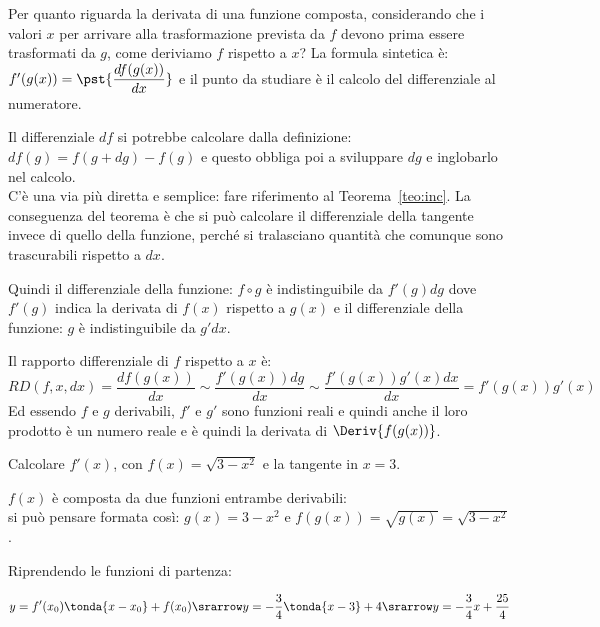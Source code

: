 \vspace{1em}
Per quanto riguarda la derivata di una funzione composta, 
considerando che i valori \(x\) per arrivare alla trasformazione prevista 
da \(f\) devono prima essere trasformati da \(g\), come deriviamo  \(f\) 
rispetto a \(x\)? La formula sintetica è: 
\(f'(g(x))=\pst{\dfrac{df(g(x))}{dx}}\) e il punto da studiare è il calcolo 
del differenziale al numeratore.

Il differenziale \(df\) si potrebbe calcolare dalla definizione: 
\(df(g)=f(g+dg)-f(g)\) e questo obbliga poi a sviluppare \(dg\) e 
inglobarlo nel calcolo. \\
C'è una via più diretta e semplice: fare riferimento al 
Teorema~\ref{teo:inc}.
La conseguenza del teorema è che si può calcolare il differenziale della 
tangente invece di quello della funzione, perché si tralasciano quantità 
che comunque sono trascurabili rispetto a \(dx\). 

Quindi il differenziale della funzione: \(f \circ g\) 
è indistinguibile da \(f'(g)dg\) 
dove \(f'(g)\) indica la derivata di \(f(x)\) rispetto a \(g(x)\) 
e il differenziale della funzione: \(g\) 
è indistinguibile da \(g'dx\). 

Il rapporto differenziale di \(f\) rispetto a \(x\) è: 
\[RD(f, x, dx) = \dfrac{df(g(x))}{dx} \sim 
          \dfrac{f'(g(x)) dg}{dx} \sim 
          \dfrac{f'(g(x)) g'(x) dx}{dx} = f'(g(x)) g'(x)\]
Ed essendo \(f\) e \(g\) derivabili, \(f'\) e \(g'\) sono funzioni reali
e quindi anche il loro prodotto è un numero reale e è quindi la derivata 
di \(\Deriv{f(g(x))}\).

\begin{esempio}
Calcolare \(f'(x)\), con \(f(x)=\sqrt{3-x^2}\) e la tangente in \(x = 3\).

\(f(x)\) è composta da due funzioni entrambe derivabili: \\
si può pensare formata così: 
\(g(x)=3-x^2\) \quad e \quad \(f(g(x))=\sqrt{g(x)}=\sqrt{3-x^2}\).

\begin{center} \scalebox{1}{\boxfcompostab} \end{center}
\label{gra:differenziazione_boxcompostaa}

Riprendendo le funzioni di partenza:

\[y = f'(x_0) \tonda{x -x_0} + f(x_0) \srarrow
  y = -\dfrac{3}{4} \tonda{x -3} + 4 \srarrow
  y = -\dfrac{3}{4} x +\dfrac{25}{4}\]
\end{esempio}

